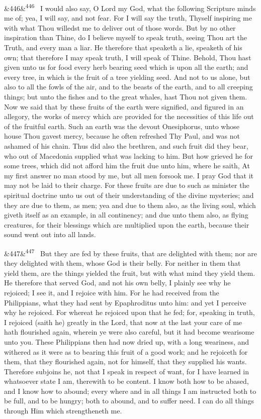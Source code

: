 \documentclass[12pt]{article}
\newcommand{\para}[1][]{\par\noindent\ifx&#1&\else\textsuperscript{\footnotesize #1}~\fi}
\begin{document}
\para[446] I would also say, O Lord my God, what the following Scripture minds me of; yea, I will say, and not fear. For I will say the truth, Thyself inspiring me with what Thou willedst me to deliver out of those words. But by no other inspiration than Thine, do I believe myself to speak truth, seeing Thou art the Truth, and every man a liar. He therefore that speaketh a lie, speaketh of his own; that therefore I may speak truth, I will speak of Thine. Behold, Thou hast given unto us for food every herb bearing seed which is upon all the earth; and every tree, in which is the fruit of a tree yielding seed. And not to us alone, but also to all the fowls of the air, and to the beasts of the earth, and to all creeping things; but unto the fishes and to the great whales, hast Thou not given them. Now we said that by these fruits of the earth were signified, and figured in an allegory, the works of mercy which are provided for the necessities of this life out of the fruitful earth. Such an earth was the devout Onesiphorus, unto whose house Thou gavest mercy, because he often refreshed Thy Paul, and was not ashamed of his chain. Thus did also the brethren, and such fruit did they bear, who out of Macedonia supplied what was lacking to him. But how grieved he for some trees, which did not afford him the fruit due unto him, where he saith, At my first answer no man stood by me, but all men forsook me. I pray God that it may not be laid to their charge. For these fruits are due to such as minister the spiritual doctrine unto us out of their understanding of the divine mysteries; and they are due to them, as men; yea and due to them also, as the living soul, which giveth itself as an example, in all continency; and due unto them also, as flying creatures, for their blessings which are multiplied upon the earth, because their sound went out into all lands.

\para[447] But they are fed by these fruits, that are delighted with them; nor are they delighted with them, whose God is their belly. For neither in them that yield them, are the things yielded the fruit, but with what mind they yield them. He therefore that served God, and not his own belly, I plainly see why he rejoiced; I see it, and I rejoice with him. For he had received from the Philippians, what they had sent by Epaphroditus unto him: and yet I perceive why he rejoiced. For whereat he rejoiced upon that he fed; for, speaking in truth, I rejoiced (saith he) greatly in the Lord, that now at the last your care of me hath flourished again, wherein ye were also careful, but it had become wearisome unto you. These Philippians then had now dried up, with a long weariness, and withered as it were as to bearing this fruit of a good work; and he rejoiceth for them, that they flourished again, not for himself, that they supplied his wants. Therefore subjoins he, not that I speak in respect of want, for I have learned in whatsoever state I am, therewith to be content. I know both how to be abased, and I know how to abound; every where and in all things I am instructed both to be full, and to be hungry; both to abound, and to suffer need. I can do all things through Him which strengtheneth me.
\end{document}
